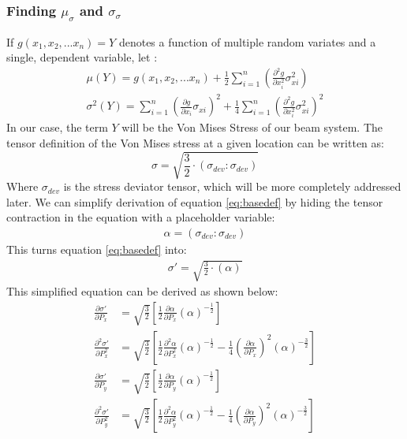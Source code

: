 \subsubsection{Finding $\mu_\sigma$ and $\sigma_\sigma$}
If $g(x_1, x_2, ... x_n) = Y$ denotes a function of multiple random variates and a single, dependent variable, let \cite{taylor}:
   \begin{align}
	   \mu(Y) = g(x_1, x_2, ... x_n) + \frac{1}{2} \sum_{i=1}^{n}\left( \frac{\partial^2 g}{\partial x_i^2} \sigma_{xi}^2  \right)
	            \label{eq:mu}\\
	   \sigma^2(Y) = \sum_{i=1}^{n}\left( \frac{\partial g}{\partial x_i} \sigma_{xi}  \right)^2 + 
			 \frac{1}{4} \sum_{i=1}^{n}\left( \frac{\partial^2 g}{\partial x_i^2} \sigma_{xi}^2  \right)^2 \label{eq:sigma}
   \end{align}
In our case, the term $Y$ will be the Von Mises Stress of our beam system. The tensor definition of the Von Mises stress at a given location can be written as:
   \begin{equation}
      \sigma = \sqrt{\frac{3}{2} \cdot \left(\sigma_{dev}:\sigma_{dev} \right)}
	\label{eq:basedef}
   \end{equation}
Where $\sigma_{dev}$ is the stress deviator tensor, which will be more completely addressed later. 
We can simplify derivation of equation \ref{eq:basedef} by hiding the tensor contraction in the equation with a placeholder variable:
   \begin{align}
	   \alpha = (\sigma_{dev}:\sigma_{dev})
	   \label{eq:defalpha}
   \end{align}
This turns equation \ref{eq:basedef} into:
   \begin{align}
      \sigma' = \sqrt{\frac{3}{2} \cdot \left(\alpha\right)}
   \end{align}
This simplified equation can be derived as shown below: 
   \begin{align}
	   \frac{\partial \sigma'}{\partial P_x} &= \sqrt{\frac{3}{2}} \left[\frac{1}{2} \frac{\partial \alpha}{\partial P_x} 
						    \left( \alpha \right)^{-\frac{1}{2}}\right]\label{eq:fd_vmx}\\
	   \frac{\partial^2 \sigma'}{\partial P_x^2} &= \sqrt{\frac{3}{2}} \left[ \frac{1}{2}  \frac{\partial ^2 \alpha}{\partial P_x^2}
	                                                \left( \alpha \right)^{-\frac{1}{2}} - 
							\frac{1}{4}  
							\left(\frac{\partial \alpha}{\partial P_x}\right)^2
							\left( \alpha \right)^{-\frac{3}{2}}\right] \\
	   \frac{\partial \sigma'}{\partial P_y} &= \sqrt{\frac{3}{2}} \left[\frac{1}{2} \frac{\partial \alpha}{\partial P_y} 
						    \left( \alpha \right)^{-\frac{1}{2}}\right]\\
	   \frac{\partial^2 \sigma'}{\partial P_y^2} &= \sqrt{\frac{3}{2}} \left[ \frac{1}{2}  \frac{\partial ^2 \alpha}{\partial P_y^2}
	                                                \left( \alpha \right)^{-\frac{1}{2}} - 
							\frac{1}{4}   
							\left(\frac{\partial \alpha}{\partial P_y}\right)^2
							\left( \alpha \right)^{-\frac{3}{2}}\right] \label{eq:sd_vmy}
   \end{align}
